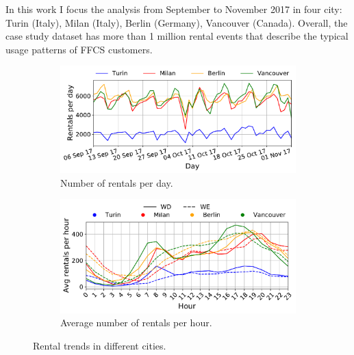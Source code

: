 In this work I focus the analysis from September to November 2017 in four city: Turin (Italy), Milan (Italy), Berlin (Germany), Vancouver (Canada).
Overall, the case study dataset has more than 1 million rental events that describe the typical usage patterns of FFCS customers. 


\begin{figure}[t]
    \begin{center}
        \begin{subfigure}{\textwidth}
            \includegraphics[width=\columnwidth]{figures/bookings_per_day.pdf}
            \caption{Number of rentals per day.}
            \label{fig:6_3_rentals_per_day}
        \end{subfigure}
         \begin{subfigure}{\textwidth}
             \includegraphics[width=\columnwidth]{figures/aggBookginfsPerHour.pdf}
             \caption{Average number of rentals per hour.}
             \label{fig:6_3_rentals_per_hour}
         \end{subfigure}
         \caption{Rental trends in different cities.}
         \label{fig:6_3_rentals_trends}
\end{center}
\end{figure}


